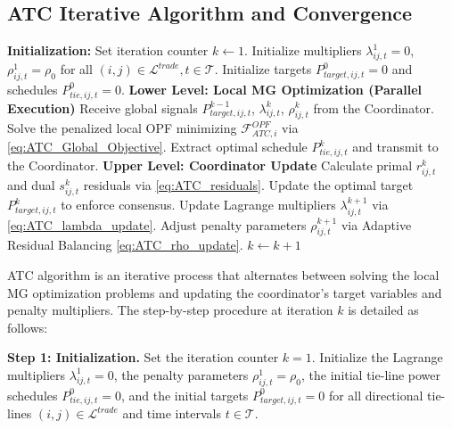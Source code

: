 \subsection{ATC Iterative Algorithm and Convergence}
\begin{algorithm}[H]
\caption{Distributed ATC Algorithm}
\label{alg:atc_coordination}
\begin{algorithmic}[1]
\State \textbf{Initialization:} Set iteration counter $k \leftarrow 1$.
\State Initialize multipliers $\lambda_{ij,t}^1 = 0$, $\rho_{ij,t}^1 = \rho_0$ for all $(i,j) \in \mathcal{L}^{trade}, t \in \mathcal{T}$.
\State Initialize targets $P_{target,ij,t}^0 = 0$ and schedules $P_{tie,ij,t}^0 = 0$.
\Repeat
    \State \textbf{Lower Level: Local MG Optimization (Parallel Execution)}
        \State Receive global signals $P_{target,ij,t}^{k-1}$, $\lambda_{ij,t}^k$, $\rho_{ij,t}^k$ from the Coordinator.
        \State Solve the penalized local OPF minimizing $\mathcal{F}_{ATC, i}^{OPF}$ via \eqref{eq:ATC_Global_Objective}.
        \State Extract optimal schedule $P_{tie,ij,t}^k$ and transmit to the Coordinator.
    \EndFor
    \State \textbf{Upper Level: Coordinator Update}
    \State Calculate primal $r_{ij,t}^k$ and dual $s_{ij,t}^k$ residuals via \eqref{eq:ATC_residuals}.
    \State Update the optimal target $P_{target,ij,t}^k$ to enforce consensus.
    \State Update Lagrange multipliers $\lambda_{ij,t}^{k+1}$ via \eqref{eq:ATC_lambda_update}.
    \State Adjust penalty parameters $\rho_{ij,t}^{k+1}$ via Adaptive Residual Balancing \eqref{eq:ATC_rho_update}.
    \State $k \leftarrow k + 1$
\end{algorithmic}
\end{algorithm}

ATC algorithm is an iterative process that alternates between solving the local MG optimization problems and updating the coordinator's target variables and penalty multipliers. The step-by-step procedure at iteration $k$ is detailed as follows:

\textbf{Step 1: Initialization.} Set the iteration counter $k = 1$. Initialize the Lagrange multipliers $\lambda_{ij,t}^1 = 0$, the penalty parameters $\rho_{ij,t}^1 = \rho_0$, the initial tie-line power schedules $P_{tie,ij,t}^0 = 0$, and the initial targets $P_{target,ij,t}^0 = 0$ for all directional tie-lines $(i,j) \in \mathcal{L}^{trade}$ and time intervals $t \in \mathcal{T}$.

